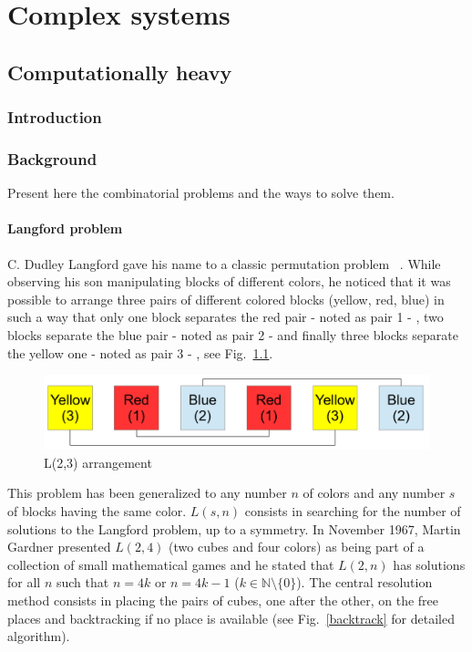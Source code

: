\part{Complex systems}

\chapter{Computationally heavy}

\section{Introduction}

\section{Background}

Present here the combinatorial problems and the ways to solve them. 

\subsection{Langford problem}

C. Dudley Langford gave his name to a classic permutation problem ~\cite{Gard56, Simp83}.  
While observing his son manipulating blocks of different colors, he noticed that it was possible to arrange three pairs of different colored blocks (yellow, red, blue) in such a way that only one block separates the red pair - noted as pair 1 - , two blocks separate the blue pair - noted as pair 2 - and finally three blocks separate the yellow one - noted as pair 3 - , see Fig.~\ref{fig:lang}.
  
\begin{figure}[htbp]    
\begin{center}    
\includegraphics[scale=0.45]{figures/langford/lgf_cubes}   
\caption{L(2,3) arrangement} \label{fig:lang}    
\end{center}
\end{figure}
  
This problem has been generalized to any number $n$ of colors and any number $s$ of blocks having the same color. 
$L(s,n)$ consists in searching for the number of solutions to the Langford problem, up to a symmetry. %
In November 1967, Martin Gardner presented $L(2,4)$ (two cubes and four colors) as being part of a collection of small mathematical games and he stated that $L(2,n)$ has solutions for all $n$ such that $n= 4k$ or $n = 4k-1$ ($k \in \mathbb{N} \setminus \{0\}$). 
The central resolution method consists in placing the pairs of cubes, one after the other, on the free places and backtracking if no place is available (see Fig.~\ref{backtrack} for detailed algorithm).

